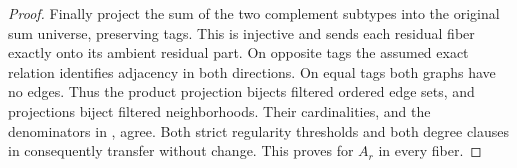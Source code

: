 \begin{proof}
Finally project the sum of the two complement subtypes into the original
sum universe, preserving tags. This is injective and sends each residual
fiber exactly onto its ambient residual part. On opposite tags the
assumed exact relation identifies adjacency in both directions. On equal
tags both graphs have no edges. Thus the product projection bijects
filtered ordered edge sets, and projections biject filtered neighborhoods.
Their cardinalities, and the denominators in , agree.
Both strict regularity thresholds and both degree clauses in
 consequently transfer without change.
This proves  for $A_r$ in every fiber.
\end{proof}
